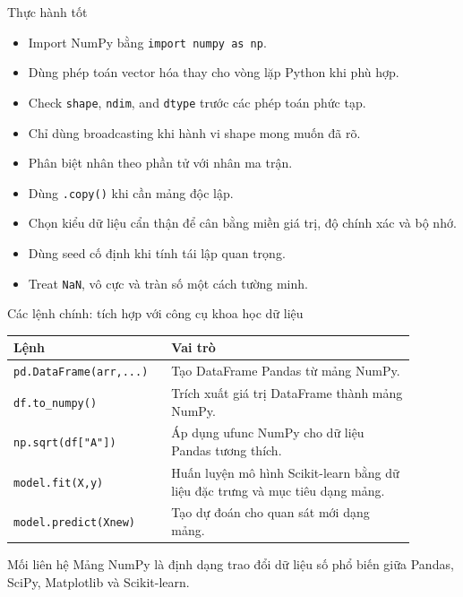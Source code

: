 \documentclass[aspectratio=169,11pt]{beamer}
\begin{document}
\begin{frame}{Thực hành tốt}
\small
\begin{itemize}
  \item Import NumPy bằng \texttt{import numpy as np}.
  \item Dùng phép toán vector hóa thay cho vòng lặp Python khi phù hợp.
  \item Check \texttt{shape}, \texttt{ndim}, and \texttt{dtype} trước các phép toán phức tạp.
  \item Chỉ dùng broadcasting khi hành vi shape mong muốn đã rõ.
  \item Phân biệt nhân theo phần tử với nhân ma trận.
  \item Dùng \texttt{.copy()} khi cần mảng độc lập.
  \item Chọn kiểu dữ liệu cẩn thận để cân bằng miền giá trị, độ chính xác và bộ nhớ.
  \item Dùng seed cố định khi tính tái lập quan trọng.
  \item Treat \texttt{NaN}, vô cực và tràn số một cách tường minh.
\end{itemize}
\end{frame}

\begin{frame}{Các lệnh chính: tích hợp với công cụ khoa học dữ liệu}
\small
\begin{tabular}{p{0.32\linewidth}p{0.57\linewidth}}
\toprule
\textbf{Lệnh} & \textbf{Vai trò} \\
\midrule
\texttt{pd.DataFrame(arr,...)} & Tạo DataFrame Pandas từ mảng NumPy. \\
\texttt{df.to\_numpy()} & Trích xuất giá trị DataFrame thành mảng NumPy. \\
\texttt{np.sqrt(df["A"])} & Áp dụng ufunc NumPy cho dữ liệu Pandas tương thích. \\
\texttt{model.fit(X,y)} & Huấn luyện mô hình Scikit-learn bằng dữ liệu đặc trưng và mục tiêu dạng mảng. \\
\texttt{model.predict(Xnew)} & Tạo dự đoán cho quan sát mới dạng mảng. \\
\bottomrule
\end{tabular}
\begin{block}{Mối liên hệ}
Mảng NumPy là định dạng trao đổi dữ liệu số phổ biến giữa Pandas, SciPy, Matplotlib và Scikit-learn.
\end{block}
\end{frame}
\end{document}
